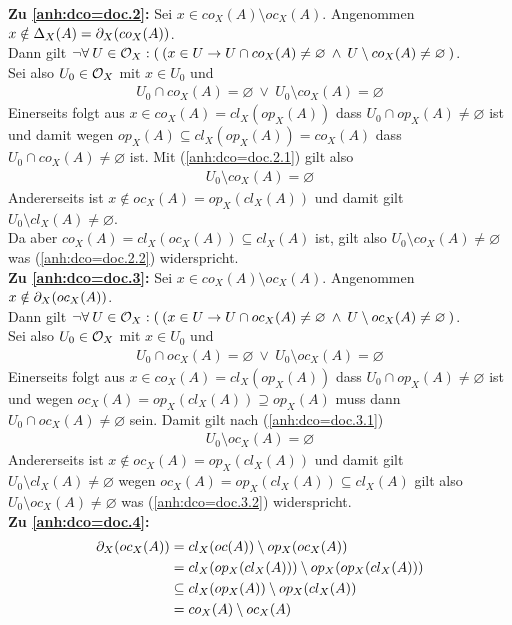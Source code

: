 \noindent	
\textbf{Zu \ref{anh:dco=doc.2}:}
	Sei $x \in co_X(A) \setminus oc_X(A)$. Angenommen $x \notin \Delta_X(A) = \partial_X(co_X(A))$. \\
	Dann gilt $\neg \forall\: U \in \mathcal{O}_X: (\: (x \in U \to U \cap co_X(A) \neq \varnothing \:\land\: U \setminus co_X(A) \neq \varnothing \:)$. \\
	Sei also $U_0 \in \mathcal{O}_X$ mit $x \in U_0$ und 
	\begin{align}
		U_0 \cap co_X(A) = \varnothing \:\lor\: U_0 \setminus co_X(A) = \varnothing \label{anh:dco=doc.2.1}
	\end{align}
	Einerseits folgt aus $x \in co_X(A) = cl_X(op_X(A))$ dass $U_0 \cap op_X(A) \neq \varnothing$ ist und damit wegen $op_X(A) \subseteq cl_X(op_X(A)) = co_X(A)$ dass $U_0 \cap co_X(A) \neq \varnothing$ ist. Mit (\ref{anh:dco=doc.2.1}) gilt also
	\begin{align}
		U_0 \setminus co_X(A) = \varnothing \label{anh:dco=doc.2.2}
	\end{align}
	Andererseits ist $x \notin oc_X(A) = op_X(cl_X(A))$ und damit gilt $U_0 \setminus cl_X(A) \neq \varnothing$. \\
	Da aber $co_X(A) =  cl_X(oc_X(A)) \subseteq cl_X(A)$ ist, gilt also $U_0 \setminus co_X(A) \neq \varnothing$ was (\ref{anh:dco=doc.2.2}) widerspricht. \\
	
\noindent	
\textbf{Zu \ref{anh:dco=doc.3}:}
	Sei $x \in co_X(A) \setminus oc_X(A)$. Angenommen $x \notin \partial_X(oc_X(A))$. \\
	Dann gilt $\neg \forall\: U \in \mathcal{O}_X: (\: (x \in U \to U \cap oc_X(A) \neq \varnothing \:\land\: U \setminus oc_X(A) \neq \varnothing \:)$. \\
	Sei also $U_0 \in \mathcal{O}_X$ mit $x \in U_0$ und 
	\begin{align}
		U_0 \cap oc_X(A) = \varnothing \:\lor\: U_0 \setminus oc_X(A) = \varnothing \label{anh:dco=doc.3.1}
	\end{align}
	Einerseits folgt aus $x \in co_X(A) = cl_X(op_X(A))$ dass $U_0 \cap op_X(A) \neq \varnothing$ ist und wegen $oc_X(A) = op_X(cl_X(A)) \supseteq op_X(A)$ muss dann $U_0 \cap oc_X(A) \neq \varnothing$ sein. Damit gilt nach (\ref{anh:dco=doc.3.1})
	\begin{align}
		U_0 \setminus oc_X(A) = \varnothing \label{anh:dco=doc.3.2}
	\end{align}	
	Andererseits ist $x \notin oc_X(A) = op_X(cl_X(A))$ und damit gilt $U_0 \setminus cl_X(A) \neq \varnothing$ wegen $oc_X(A) = op_X(cl_X(A)) \subseteq cl_X(A)$ gilt also $U_0 \setminus oc_X(A) \neq \varnothing$ was (\ref{anh:dco=doc.3.2}) widerspricht.\\
	
\noindent
\textbf{Zu \ref{anh:dco=doc.4}:}
	\begin{align*}
		\partial_X(oc_X(A)) &= cl_X(oc(A)) \setminus op_X(oc_X(A)) \\
		&= cl_X(op_X(cl_X(A))) \setminus op_X(op_X(cl_X(A))) \\
		&\subseteq cl_X(op_X(A)) \setminus op_X(cl_X(A)) \\
		& = co_X(A) \setminus oc_X(A)
	\end{align*}
